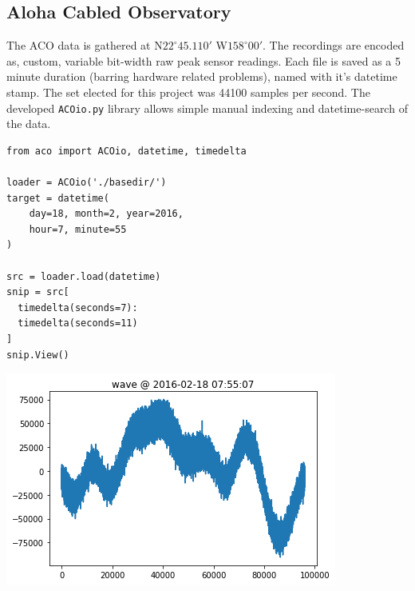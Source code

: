 \documentclass{article}
\newenvironment{Figure}
  {\par\medskip\noindent\minipage{\linewidth}}
  {\endminipage\par\medskip}
\begin{document}
\begin{multicols}{2}
\subsection{Aloha Cabled Observatory}

The ACO data is gathered at N$22^\circ45.110'$ W$158^\circ00'$. The recordings are
encoded as, custom, variable bit-width raw peak sensor readings. Each file is saved
as a 5 minute duration (barring hardware related problems), named with it's datetime
stamp. The set elected for this project was 44100 samples per second. The developed
\texttt{ACOio.py} library allows simple manual indexing and datetime-search of the data.



\begin{lstlisting}
from aco import ACOio, datetime, timedelta

loader = ACOio('./basedir/')
target = datetime(
    day=18, month=2, year=2016,
    hour=7, minute=55
)

src = loader.load(datetime)
snip = src[
  timedelta(seconds=7):
  timedelta(seconds=11)
]
snip.View()
\end{lstlisting}



\begin{Figure}


  \includegraphics[width=\columnwidth]{./rawwave.png}
  \label{fig:rawwav}
\end{Figure}

\newcommand{\figsite}[1]{\texttt{(Figure~\ref{#1})}\xspace}


\end{multicols}
\end{document}

